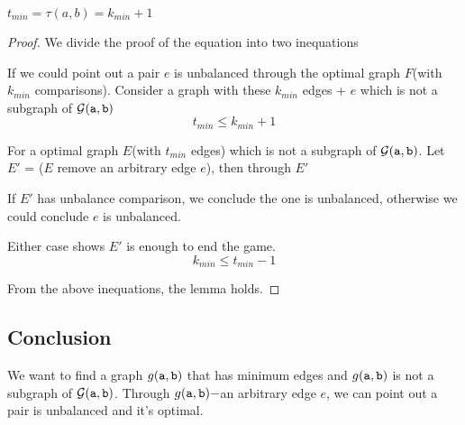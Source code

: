\begin{lemma}
$t_{min} = \tau(a,b) = k_{min}+1 $
\end{lemma}

\begin{proof}
We divide the proof of the equation into two inequations

If we could point out a pair $e$ is unbalanced through the optimal graph $F$(with $k_{min}$ comparisons).
Consider a graph with these $k_{min}$ edges + $e$ which is not a subgraph of ${\cal G}(\mathtt{a},\mathtt{b})$
\[t_{min}\leq k_{min}+1\]

For a optimal graph $E$(with $t_{min}$ edges) which is not a subgraph of ${\cal G}(\mathtt{a},\mathtt{b})$. Let $E'$ = ($E$ remove an arbitrary edge $e$), then through $E'$

If $E'$ has unbalance comparison, we conclude the one is unbalanced, otherwise we could conclude $e$ is unbalanced.

Either case shows $E'$ is enough to end the game.
\[k_{min} \leq t_{min}-1\]

From the above inequations, the lemma holds.

\end{proof}

\subsection*{Conclusion}
We want to find a graph $g(\mathtt{a},\mathtt{b})$ that has minimum edges and $g(\mathtt{a},\mathtt{b})$ is not a subgraph of ${\cal G}(\mathtt{a},\mathtt{b})$. Through $g(\mathtt{a},\mathtt{b})-$an arbitrary edge $e$, we can point out a pair is unbalanced and it's optimal.